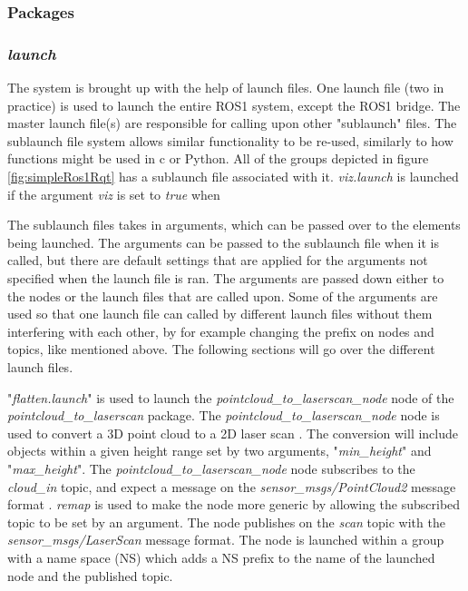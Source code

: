 \subsubsection{Packages}

\subsubsection{\textit{launch}}
The system is brought up with the help of launch files. One launch file (two in practice) is used to launch the entire ROS1 system, except the ROS1 bridge. The master launch file(s) are responsible for calling upon other "sublaunch" files. The sublaunch file system allows similar functionality to be re-used, similarly to how functions might be used in c or Python. All of the groups depicted in figure \ref{fig:simpleRos1Rqt} has a sublaunch file associated with it. \textit{viz.launch} is launched if the argument \textit{viz} is set to \textit{true} when 

The sublaunch files takes in arguments, which can be passed over to the elements being launched. The arguments can be passed to the sublaunch file when it is called, but there are default settings that are applied for the arguments not specified when the launch file is ran. The arguments are passed down either to the nodes or the launch files that are called upon. Some of the arguments are used so that one launch file can called by different launch files without them interfering with each other, by for example changing the prefix on nodes and topics, like mentioned above. The following sections will go over the different launch files.

\label{subsubsec:flatten.launch}
"\textit{flatten.launch}" is used to launch the \textit{pointcloud\_to\_laserscan\_node} 
node of the \textit{pointcloud\_to\_laserscan} package. The \textit{pointcloud\_to\_laserscan\_node} node is used to convert a 3D point cloud to a 2D laser scan \cite{pcl_ros}. The conversion will include objects within a given height range set by two arguments, "\textit{min\_height}" and "\textit{max\_height}". The \textit{pointcloud\_to\_laserscan\_node} node subscribes to the \textit{cloud\_in} topic, and expect a message on the \textit{sensor\_msgs/PointCloud2} message format \cite{pcl_ros}. \textit{remap} is used to make the node more generic by allowing the subscribed topic to be set by an argument. The node publishes on the \textit{scan} topic with the \textit{sensor\_msgs/LaserScan} message format. The node is launched within a group with a name space (NS) which adds a NS prefix to the name of the launched node and the published topic.

